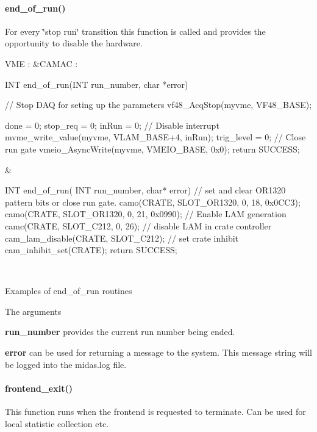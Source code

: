 \par
 \hypertarget{FE_sequence_FE_end_of_run}{}\paragraph{end\_\-of\_\-run()}\label{FE_sequence_FE_end_of_run}
For every \char`\"{}stop run\char`\"{} transition this function is called and provides the opportunity to disable the hardware. \begin{table}[h]\begin{TabularC}{2}
\hline
VME :  &CAMAC :  \\

\begin{DoxyCode}
INT end_of_run(INT run_number, char *error)
{
  // Stop DAQ for seting up the parameters
  vf48_AcqStop(myvme, VF48_BASE);

  done = 0;
  stop_req = 0;
  inRun = 0;
  // Disable interrupt
  mvme_write_value(myvme, VLAM_BASE+4, inRun);
  trig_level = 0;
  // Close run gate
  vmeio_AsyncWrite(myvme, VMEIO_BASE, 0x0);
  return SUCCESS;
}
\end{DoxyCode}
 &
\begin{DoxyCode}
INT end_of_run( INT run_number, char* error)
{
   // set and clear OR1320 pattern bits or close run gate.
   camo(CRATE, SLOT_OR1320, 0, 18, 0x0CC3);
   camo(CRATE, SLOT_OR1320, 0, 21, 0x0990);
   // Enable LAM generation
   camc(CRATE, SLOT_C212, 0, 26);  
   // disable LAM in crate controller
   cam_lam_disable(CRATE, SLOT_C212);
   // set crate inhibit 
   cam_inhibit_set(CRATE);          
   return SUCCESS;
}
\end{DoxyCode}
 \\
\end{TabularC}
\centering
\caption{Examples of end\_\-of\_\-run routines }
\end{table}
The arguments
\begin{DoxyItemize}
\item {\bfseries run\_\-number} provides the current run number being ended.
\item {\bfseries error} can be used for returning a message to the system. This message string will be logged into the midas.log file. \par

\end{DoxyItemize}

\par
 \hypertarget{FE_sequence_FE_frontend_exit}{}\paragraph{frontend\_\-exit()}\label{FE_sequence_FE_frontend_exit}
This function runs when the frontend is requested to terminate. Can be used for local statistic collection etc.

